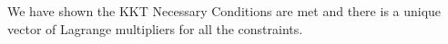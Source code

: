 \documentclass[fleqn]{article}
\begin{document}
We have shown the KKT Necessary Conditions are met and there is
a unique vector of Lagrange multipliers for all the constraints.


\end{document}
